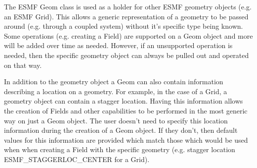 %

The ESMF Geom class is used as a holder for other ESMF geometry objects (e.g. an ESMF Grid). This allows a generic
representation of a geometry to be passed around (e.g. through a coupled system) without it's specific type being known.
Some operations (e.g. creating a Field) are supported on a Geom object and more will be added over time as needed. However, if
an unsupported operation is needed, then the specific geometry object can always be pulled out and operated on that way.

In addition to the geometry object a Geom can also contain information describing a location on a geometry. For example, in the case of
a Grid, a geometry object can contain a stagger location. Having this information allows the creation of Fields and other capabilities to
be performed in the most generic way on just a Geom object. The user doesn't need to specify this location information during the
creation of a Geom object. If they don't, then default values for this information are provided which match those which would
be used when when creating a Field with the specific geometry (e.g. stagger location ESMF\_STAGGERLOC\_CENTER for a Grid).
